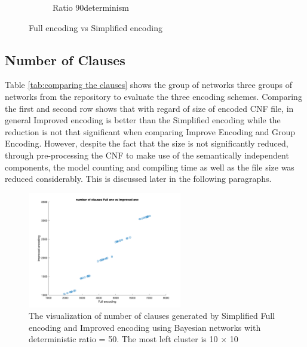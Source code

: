 \begin{figure}[h]
\begin{subfigure}{0.32\textwidth}
\caption{Ratio 90determinism}
\label{fig: r90_determin}
\end{subfigure}
 
\caption{Full encoding vs Simplified encoding}
\label{fig:determinism}
\end{figure}

\subsection{Number of Clauses}
Table \ref{tab:comparing the clauses} shows the group of networks three groups of networks from the repository to evaluate the three encoding schemes. Comparing the first and second row shows that with regard of size of encoded CNF file, in general Improved encoding is better than the Simplified encoding while the reduction is not that significant when comparing Improve Encoding and Group Encoding. However, despite the fact that the size is not significantly reduced, through pre-processing the CNF to make use of the semantically independent components, the model counting and compiling time as well as the file size was reduced considerably. This is discussed later in the following paragraphs.\\
\begin{figure}
    \centering
    \includegraphics[width = 0.6\textwidth]{pic/clauses_e1vs2.png}
    \caption{The visualization of number of clauses generated by Simplified Full encoding and Improved encoding using Bayesian networks with deterministic ratio = 50. The most left cluster is 10 $\times$ 10}
    \label{fig:clauses_compare_1v2_r50}
\end{figure}


